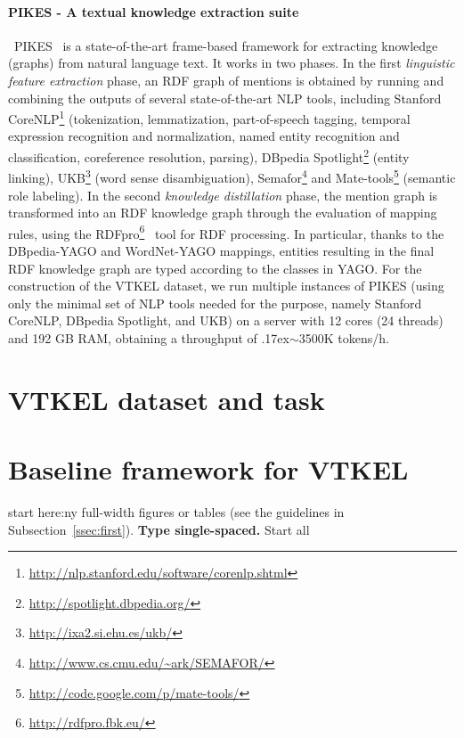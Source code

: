 \documentclass[11pt,a4paper]{article}
\begin{document}
\paragraph{PIKES - A textual knowledge extraction suite}\
PIKES~\cite{corcoglioniti2016frame} is a state-of-the-art frame-based
framework for extracting knowledge (graphs) from natural language
text. It works in two phases. In the first \emph{linguistic feature
	extraction} phase, an RDF graph of mentions is obtained by running and
combining the outputs of several state-of-the-art NLP tools, including
Stanford
CoreNLP\footnote{\url{http://nlp.stanford.edu/software/corenlp.shtml}}
(tokenization, lemmatization, part-of-speech tagging, temporal
expression recognition and normalization, named entity recognition and
classification, coreference resolution, parsing), DBpedia
Spotlight\footnote{\url{http://spotlight.dbpedia.org/}} (entity
linking), UKB\footnote{\url{http://ixa2.si.ehu.es/ukb/}} (word sense
disambiguation),
Semafor\footnote{\url{http://www.cs.cmu.edu/~ark/SEMAFOR/}} and
Mate-tools\footnote{\url{http://code.google.com/p/mate-tools/}}
(semantic role labeling). In the second \emph{knowledge distillation}
phase, the mention graph is transformed into an RDF knowledge graph
through the evaluation of mapping rules, using the
RDFpro\footnote{\url{http://rdfpro.fbk.eu/}}~\cite{rdfpro2015sac} tool
for RDF processing. In particular, thanks to the DBpedia-YAGO and
WordNet-YAGO mappings, entities resulting in the final RDF knowledge
graph are typed according to the classes in YAGO. For the construction
of the VTKEL dataset, we run multiple instances of PIKES (using only
the minimal set of NLP tools needed for the purpose, namely Stanford
CoreNLP, DBpedia Spotlight, and UKB) on a server with 12 cores (24
threads) and 192 GB RAM, obtaining a throughput of
{\raise.17ex\hbox{$\scriptstyle\sim$}}3500K tokens/h.


\section{VTKEL dataset and task}


\section{Baseline framework for VTKEL}
start here:ny full-width figures or tables (see the guidelines in
Subsection~\ref{ssec:first}). {\bf Type single-spaced.}  Start all
\end{document}

